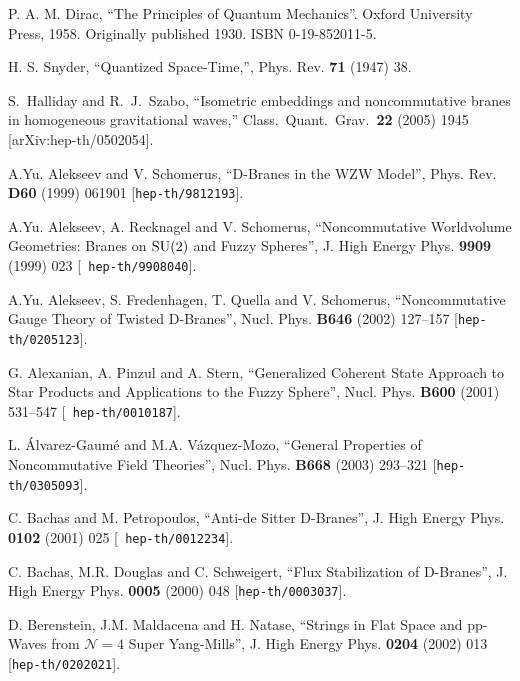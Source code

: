 \begin{thebibliography}{199}

 P. A. M. Dirac, ``The Principles of Quantum Mechanics''. Oxford
  University Press, 1958. Originally published 1930. ISBN 0-19-852011-5.

 H. S. Snyder, ``Quantized Space-Time,'', Phys. Rev.
  {\bf 71} (1947) 38.

  S.~Halliday and R.~J.~Szabo,
  ``Isometric embeddings and noncommutative branes in homogeneous
  gravitational waves,''
  Class.\ Quant.\ Grav.\  {\bf 22} (2005) 1945
  [arXiv:hep-th/0502054].
  
 A.Yu. Alekseev and V. Schomerus, ``D-Branes in the WZW
  Model'', Phys. Rev. {\bf D60} (1999) 061901 [{\tt hep-th/9812193}].

 A.Yu. Alekseev, A. Recknagel and V. Schomerus,
  ``Noncommutative Worldvolume Geometries: Branes on ${\rm SU}(2)$ and
  Fuzzy Spheres'', J. High Energy Phys. {\bf 9909} (1999) 023 [{\tt
    hep-th/9908040}].

 A.Yu. Alekseev, S. Fredenhagen, T. Quella and
  V. Schomerus, ``Noncommutative Gauge Theory of Twisted D-Branes'',
  Nucl. Phys. {\bf B646} (2002) 127--157 [{\tt hep-th/0205123}].

 G. Alexanian, A. Pinzul and A. Stern, ``Generalized
  Coherent State Approach to Star Products and Applications to the
  Fuzzy Sphere'', Nucl. Phys. {\bf B600} (2001) 531--547 [{\tt
    hep-th/0010187}].

 L. \'Alvarez-Gaum\'e and M.A. V\'azquez-Mozo, ``General
  Properties of Noncommutative Field Theories'', Nucl. Phys. {\bf
    B668} (2003) 293--321 [{\tt hep-th/0305093}].

 C. Bachas and M. Petropoulos, ``Anti-de Sitter
  D-Branes'', J. High Energy Phys. {\bf 0102} (2001) 025 [{\tt
  hep-th/0012234}].

 C. Bachas, M.R. Douglas and C. Schweigert, ``Flux
  Stabilization of D-Branes'', J. High Energy Phys. {\bf 0005} (2000)
  048 [{\tt hep-th/0003037}].

 D. Berenstein, J.M. Maldacena and H. Natase, ``Strings
  in Flat Space and pp-Waves from $\mathcal{N}=4$ Super Yang-Mills'',
  J. High Energy Phys. {\bf 0204} (2002) 013 [{\tt hep-th/0202021}].


\end{thebibliography}
